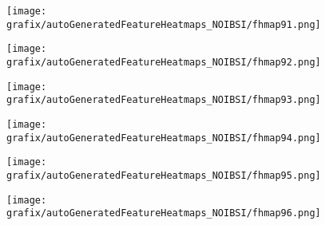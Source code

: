 \hspace{\hsp} 
\begin{subfigure}{\wid\textwidth} 
    \centering 
    \caption{\tiny \sffamily {}} 
    \vspace{\vsp} 
    \texttt{[image: grafix/autoGeneratedFeatureHeatmaps\_NOIBSI/fhmap91.png]} 
\end{subfigure} 
\hspace{\hsp} 
\begin{subfigure}{\wid\textwidth} 
    \centering 
    \caption{\tiny \sffamily {}} 
    \vspace{\vsp} 
    \texttt{[image: grafix/autoGeneratedFeatureHeatmaps\_NOIBSI/fhmap92.png]} 
\end{subfigure} 
\hspace{\hsp} 
\begin{subfigure}{\wid\textwidth} 
    \centering 
    \caption{\tiny \sffamily {}} 
    \vspace{\vsp} 
    \texttt{[image: grafix/autoGeneratedFeatureHeatmaps\_NOIBSI/fhmap93.png]} 
\end{subfigure} 
\hspace{\hsp} 
\begin{subfigure}{\wid\textwidth} 
    \centering 
    \caption{\tiny \sffamily {}} 
    \vspace{\vsp} 
    \texttt{[image: grafix/autoGeneratedFeatureHeatmaps\_NOIBSI/fhmap94.png]} 
\end{subfigure} 
\hspace{\hsp} 
\begin{subfigure}{\wid\textwidth} 
    \centering 
    \caption{\tiny \sffamily {}} 
    \vspace{\vsp} 
    \texttt{[image: grafix/autoGeneratedFeatureHeatmaps\_NOIBSI/fhmap95.png]} 
\end{subfigure} 
\hspace{\hsp} 
\begin{subfigure}{\wid\textwidth} 
    \centering 
    \caption{\tiny \sffamily {}} 
    \vspace{\vsp} 
    \texttt{[image: grafix/autoGeneratedFeatureHeatmaps\_NOIBSI/fhmap96.png]} 
\end{subfigure} 
\hspace{\hsp} 
